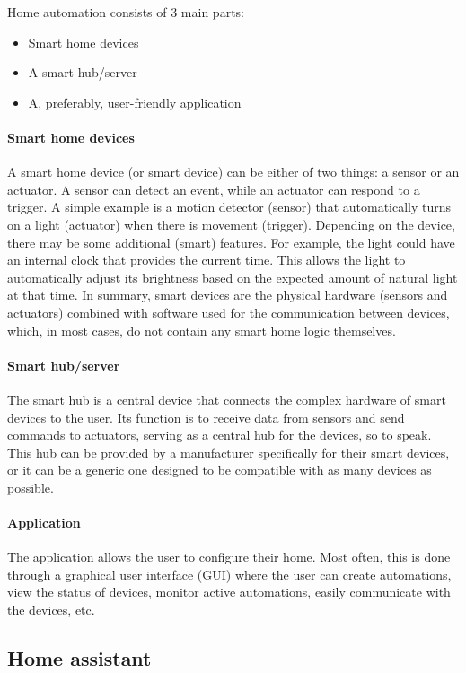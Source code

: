 \documentclass[11pt,a4paper]{report}
\begin{document}
Home automation consists of 3 main parts:
\begin{itemize}
    \item Smart home devices
    \item A smart hub/server
    \item A, preferably, user-friendly application
\end{itemize}

\paragraph{Smart home devices}
A smart home device (or smart device) can be either of two things: a sensor or an actuator. A sensor can detect an event, while an actuator can respond to a trigger. A simple example is a motion detector (sensor) that automatically turns on a light (actuator) when there is movement (trigger). Depending on the device, there may be some additional (smart) features. For example, the light could have an internal clock that provides the current time. This allows the light to automatically adjust its brightness based on the expected amount of natural light at that time. In summary, smart devices are the physical hardware (sensors and actuators) combined with software used for the communication between devices, which, in most cases, do not contain any smart home logic themselves.

\paragraph{Smart hub/server}
The smart hub is a central device that connects the complex hardware of smart devices to the user. Its function is to receive data from sensors and send commands to actuators, serving as a central hub for the devices, so to speak. This hub can be provided by a manufacturer specifically for their smart devices, or it can be a generic one designed to be compatible with as many devices as possible.

\paragraph{Application}
The application allows the user to configure their home. Most often, this is done through a graphical user interface (GUI) where the user can create automations, view the status of devices, monitor active automations, easily communicate with the devices, etc.

\subsection{Home assistant}
\end{document}
